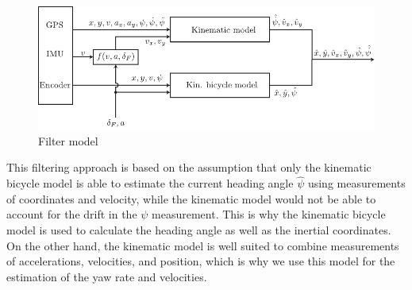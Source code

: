 \begin{figure}[ht]
    \centering
      \includegraphics{../../Figures/Illustrator/FilterModel.pdf}
    \caption{Filter model}
    \label{fig:filter_model}
\end{figure}
This filtering approach is based on the assumption that only the kinematic bicycle model is able to estimate the current heading angle $\hat\psi$ using measurements of coordinates and velocity, while the kinematic model would not be able to account for the drift in the $\psi$ measurement. This is why the kinematic bicycle model is used to calculate the heading angle as well as the inertial coordinates. On the other hand, the kinematic model is well suited to combine measurements of accelerations, velocities, and position, which is why we use this model for the estimation of the yaw rate and velocities.

